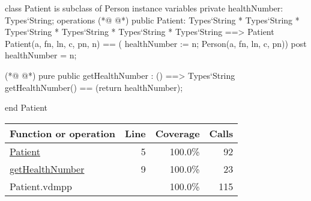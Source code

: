 \begin{vdmpp}[breaklines=true]
class Patient is subclass of Person
instance variables
  private healthNumber: Types`String;
operations
(*@
\label{Patient:5}
@*)
 public Patient: Types`String * Types`String * Types`String * Types`String * Types`String * Types`String ==> Patient
  Patient(a, fn, ln, c, pn, n) == ( healthNumber := n; Person(a, fn, ln, c, pn))
 post healthNumber = n;
 
(*@
\label{getHealthNumber:9}
@*)
 pure public getHealthNumber : () ==> Types`String
  getHealthNumber() == (return healthNumber);

end Patient
\end{vdmpp}
\bigskip
\begin{longtable}{|l|r|r|r|}
\hline
Function or operation & Line & Coverage & Calls \\
\hline
\hline
\hyperref[Patient:5]{Patient} & 5&100.0\% & 92 \\
\hline
\hyperref[getHealthNumber:9]{getHealthNumber} & 9&100.0\% & 23 \\
\hline
\hline
Patient.vdmpp & & 100.0\% & 115 \\
\hline
\end{longtable}

